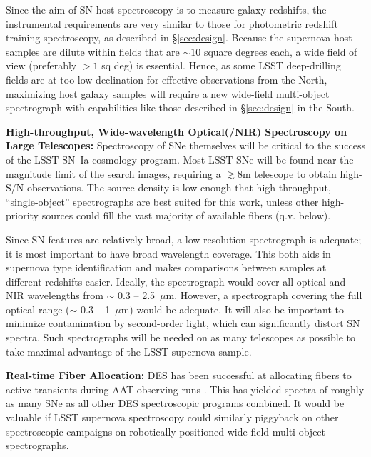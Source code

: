 Since the aim of SN host spectroscopy is to measure galaxy redshifts, the instrumental requirements are very similar to those for photometric redshift training spectroscopy, as described in \S \ref{sec:design}.  Because the supernova host samples are dilute within fields that are $\sim 10$ square degrees each, a wide field of view (preferably $>1$ sq deg) is essential.   Hence, as some LSST deep-drilling fields are at too low declination for effective observations from the North, maximizing host galaxy samples will require a new wide-field multi-object spectrograph with capabilities like those described in \S \ref{sec:design} in the South.


{\bf High-throughput, Wide-wavelength Optical(/NIR) Spectroscopy on Large Telescopes:}  Spectroscopy of SNe themselves will be critical to the success of the LSST
SN~Ia cosmology program.  Most LSST SNe will be found near the
magnitude limit of the search images, requiring a $\gtrsim$8m
telescope to obtain high-S/N observations.  The source density is low enough that high-throughput, ``single-object'' spectrographs are best suited for this work, unless other high-priority sources could fill the vast majority of available fibers (q.v. below).  

Since SN features are relatively broad, a low-resolution spectrograph
is adequate; it is most important to have broad wavelength coverage.  This both aids in
supernova type identification and
makes comparisons between samples at different redshifts easier.  Ideally, the spectrograph
would cover all optical and NIR wavelengths from $\sim$ 0.3 --
2.5~$\mu$m.  However, a spectrograph covering the full optical range
($\sim$ 0.3 -- 1~$\mu$m) would be adequate.   It will also be important to minimize contamination by second-order light, which can significantly distort SN spectra.  Such spectrographs will be needed on as many telescopes as possible to take maximal advantage of the LSST supernova sample.


{\bf Real-time Fiber Allocation:}  DES has been successful at allocating fibers to active transients
during AAT observing runs \citep{Yuan15}.  This has yielded spectra of roughly as
many SNe as all other DES spectroscopic programs combined.  It would be valuable if LSST supernova spectroscopy could similarly piggyback on other spectroscopic campaigns on robotically-positioned wide-field multi-object spectrographs.  



